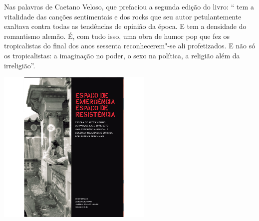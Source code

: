 Nas palavras de Caetano Veloso, que prefaciou a segunda edição do livro: “{} tem a vitalidade das canções sentimentais e dos rocks que seu autor petulantemente exaltava contra todas as tendências de opinião da época. E tem a densidade do romantismo alemão. É, com tudo isso, uma obra de humor pop que fez os tropicalistas do final dos anos sessenta reconhecerem"-se ali profetizados. E não só os tropicalistas: a imaginação no poder, o sexo na política, a religião além da irreligião”.


\vfill

\hspace*{-.4cm}\begin{minipage}[c]{.5\linewidth}
\small{
{}}
\end{minipage}

\pagebreak

\begin{center}
\hspace*{-3.6cm}
\hspace*{3.1cm}\includegraphics[width=74mm]{./grid/lage.jpg}
\end{center}

\hspace*{-7cm}\hrulefill\hspace*{-7cm}

